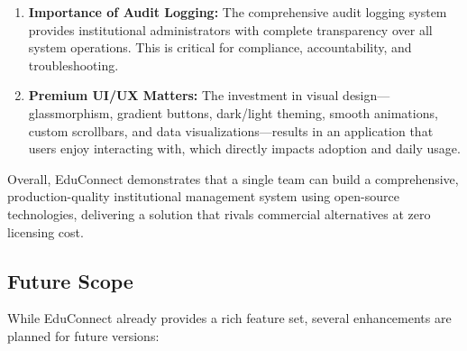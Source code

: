 \begin{enumerate}[label=\arabic*., leftmargin=2em]
    \item \textbf{Importance of Audit Logging:} The comprehensive audit logging system provides institutional administrators with complete transparency over all system operations. This is critical for compliance, accountability, and troubleshooting.
    
    \item \textbf{Premium UI/UX Matters:} The investment in visual design---glassmorphism, gradient buttons, dark/light theming, smooth animations, custom scrollbars, and data visualizations---results in an application that users enjoy interacting with, which directly impacts adoption and daily usage.
\end{enumerate}

Overall, EduConnect demonstrates that a single team can build a comprehensive, production-quality institutional management system using open-source technologies, delivering a solution that rivals commercial alternatives at zero licensing cost.

\subsection{Future Scope}

While EduConnect already provides a rich feature set, several enhancements are planned for future versions:

